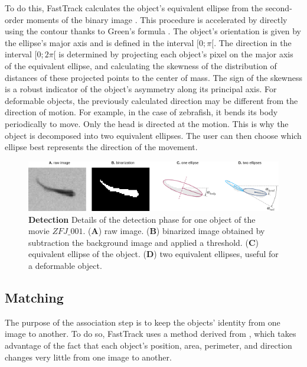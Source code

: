     To do this, FastTrack calculates the object's equivalent ellipse from the second-order moments of the binary image \cite{rocha2002image}. This procedure is accelerated by directly using the contour thanks to Green's formula \cite{riemann_1851}. The object's orientation is given by the ellipse's major axis and is defined in the interval $[0;\pi[$. The direction in the interval $[0; 2\pi[ $ is determined by projecting each object's pixel on the major axis of the equivalent ellipse, and calculating the skewness of the distribution of distances of these projected points to the center of mass. The sign of the skewness is a robust indicator of the object's asymmetry along its principal axis.
    For deformable objects, the previously calculated direction may be different from the direction of motion. For example, in the case of zebrafish, it bends its body periodically to move. Only the head is directed at the motion. This is why the object is decomposed into two equivalent ellipses. The user can then choose which ellipse best represents the direction of the movement.

    \begin{figure}[h!]
    \centering
    \includegraphics[width=1\textwidth]{part_1/assets/Figure_ellipse.png}
    \caption{\textbf{Detection} Details of the detection phase for one object of the movie $ZFJ\_001$.
        (\textbf{A}) raw image.
        (\textbf{B}) binarized image obtained by subtraction the background image and applied a threshold.
        (\textbf{C}) equivalent ellipse of the object.
        (\textbf{D}) two equivalent ellipses, useful for a deformable object.}
    \label{part_1:fig_22}
    \end{figure}

    \subsection{Matching}
    The purpose of the association step is to keep the objects' identity from one image to another. To do so, FastTrack uses a method derived from \cite{qian2016effective}, which takes advantage of the fact that each object's position, area, perimeter, and direction changes very little from one image to another.

